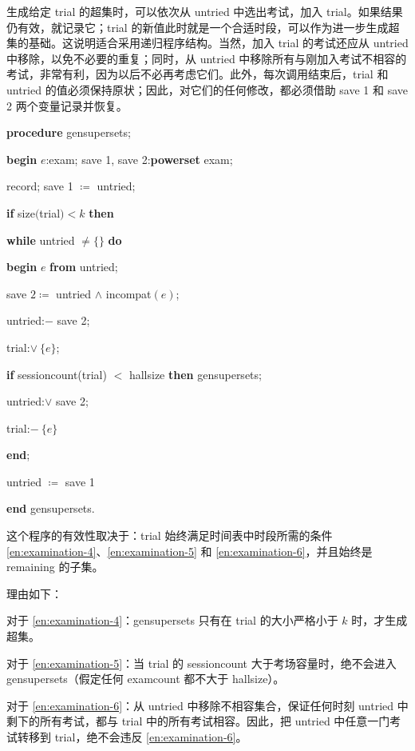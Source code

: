\documentclass[twoside,11pt,fontset=none]{ctexbook}
\begin{document}
生成给定 trial 的超集时，可以依次从 untried 中选出考试，加入 trial。如果结果仍有效，就记录它；trial 的新值此时就是一个合适时段，可以作为进一步生成超集的基础。这说明适合采用递归程序结构。当然，加入 trial 的考试还应从 untried 中移除，以免不必要的重复；同时，从 untried 中移除所有与刚加入考试不相容的考试，非常有利，因为以后不必再考虑它们。此外，每次调用结束后，trial 和 untried 的值必须保持原状；因此，对它们的任何修改，都必须借助 save 1 和 save 2 两个变量记录并恢复。

\textbf{procedure} gensupersets;

\quad \textbf{begin} $e$:exam; save 1, save 2:\textbf{powerset} exam;

\quad \quad record; save 1 $\coloneq$ untried;

\quad \quad \textbf{if} size$($trial$) < k$ \textbf{then}

\quad \quad \textbf{while} untried $\neq \{\}$ \textbf{do}

\quad \quad \quad \textbf{begin} $e$ \textbf{from} untried;

\quad \quad \quad \quad save $2\coloneq$ untried $\wedge$ incompat$(e)$;

\quad \quad \quad \quad untried:$-$ save 2;

\quad \quad \quad \quad trial:$\vee\ \{e\}$;

\quad \quad \quad \quad \textbf{if} sessioncount(trial) $<$ hallsize \textbf{then} gensupersets;

\quad \quad \quad \quad untried:$\vee$ save 2;

\quad \quad \quad \quad trial:$-\ \{e\}$

\quad \quad \quad \textbf{end};

\quad \quad \quad untried $\coloneq$ save 1

\quad \textbf{end} gensupersets.

这个程序的有效性取决于：trial 始终满足时间表中时段所需的条件 \ref{en:examination-4}、\ref{en:examination-5} 和 \ref{en:examination-6}，并且始终是 remaining 的子集。

理由如下：

对于 \ref{en:examination-4}：gensupersets 只有在 trial 的大小严格小于 $k$ 时，才生成超集。

对于 \ref{en:examination-5}：当 trial 的 sessioncount 大于考场容量时，绝不会进入 gensupersets（假定任何 examcount 都不大于 hallsize）。

对于 \ref{en:examination-6}：从 untried 中移除不相容集合，保证任何时刻 untried 中剩下的所有考试，都与 trial 中的所有考试相容。因此，把 untried 中任意一门考试转移到 trial，绝不会违反 \ref{en:examination-6}。
\end{document}

